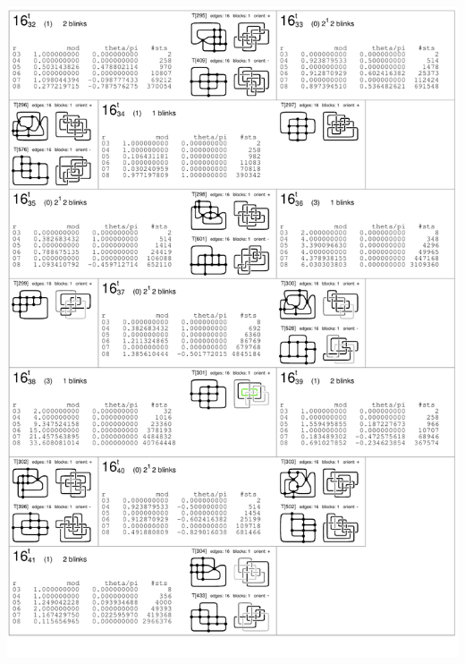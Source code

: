 \begin{center}
 \includegraphics[height=23.5cm]{E.figsbw2/con3catalog018_bw.pdf} \eject

\end{center}
